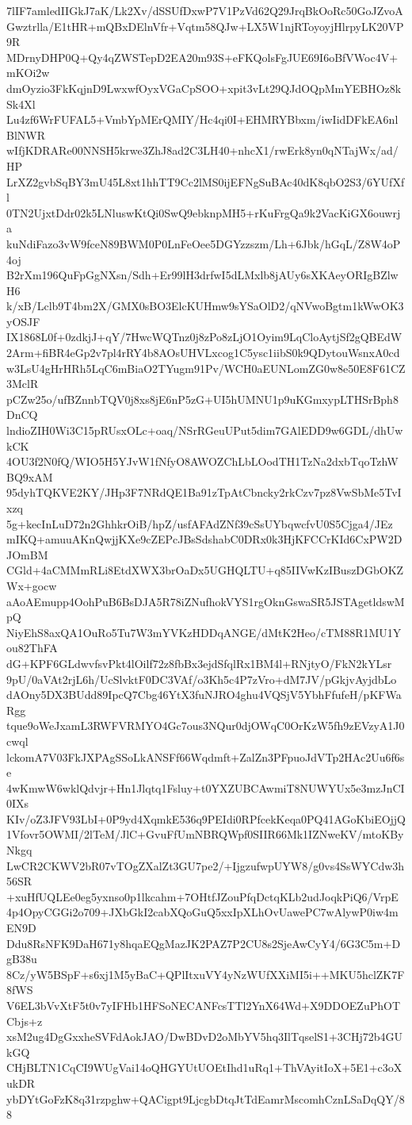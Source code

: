7lIF7amledIIGkJ7aK/Lk2Xv/dSSUfDxwP7V1PzVd62Q29JrqBkOoRc50GoJZvoA
Gwztrlla/E1tHR+mQBxDElnVfr+Vqtm58QJw+LX5W1njRToyoyjHlrpyLK20VP9R
MDrnyDHP0Q+Qy4qZWSTepD2EA20m93S+eFKQolsFgJUE69I6oBfVWoc4V+mKOi2w
dmOyzio3FkKqjnD9LwxwfOyxVGaCpSOO+xpit3vLt29QJdOQpMmYEBHOz8kSk4Xl
Lu4zf6WrFUFAL5+VmbYpMErQMIY/Hc4qi0I+EHMRYBbxm/iwIidDFkEA6nlBlNWR
wIfjKDRARe00NNSH5krwe3ZhJ8ad2C3LH40+nhcX1/rwErk8yn0qNTajWx/ad/HP
LrXZ2gvbSqBY3mU45L8xt1hhTT9Cc2lMS0ijEFNgSuBAc40dK8qbO2S3/6YUfXfl
0TN2UjxtDdr02k5LNluswKtQi0SwQ9ebknpMH5+rKuFrgQa9k2VacKiGX6ouwrja
kuNdiFazo3vW9fceN89BWM0P0LnFeOee5DGYzzszm/Lh+6Jbk/hGqL/Z8W4oP4oj
B2rXm196QuFpGgNXsn/Sdh+Er99lH3drfwI5dLMxlb8jAUy6sXKAeyORIgBZlwH6
k/xB/Lclb9T4bm2X/GMX0sBO3ElcKUHmw9sYSaOlD2/qNVwoBgtm1kWwOK3yOSJF
IX1868L0f+0zdkjJ+qY/7HwcWQTnz0j8zPo8zLjO1Oyim9LqCloAytjSf2gQBEdW
2Arm+fiBR4eGp2v7pl4rRY4b8AOsUHVLxcog1C5ysc1iibS0k9QDytouWsnxA0cd
w3LsU4gHrHRh5LqC6mBiaO2TYugm91Pv/WCH0aEUNLomZG0w8e50E8F61CZ3MclR
pCZw25o/ufBZnnbTQV0j8xs8jE6nP5zG+UI5hUMNU1p9uKGmxypLTHSrBph8DnCQ
lndioZIH0Wi3C15pRUsxOLc+oaq/NSrRGeuUPut5dim7GAlEDD9w6GDL/dhUwkCK
4OU3f2N0fQ/WIO5H5YJvW1fNfyO8AWOZChLbLOodTH1TzNa2dxbTqoTzhWBQ9xAM
95dyhTQKVE2KY/JHp3F7NRdQE1Ba91zTpAtCbncky2rkCzv7pz8VwSbMe5TvIxzq
5g+kecInLuD72n2GhhkrOiB/hpZ/usfAFAdZNf39cSsUYbqwcfvU0S5Cjga4/JEz
mIKQ+amuuAKnQwjjKXe9cZEPcJBsSdshabC0DRx0k3HjKFCCrKId6CxPW2DJOmBM
CGld+4aCMMmRLi8EtdXWX3brOaDx5UGHQLTU+q85IIVwKzIBuszDGbOKZWx+gocw
aAoAEmupp4OohPuB6BsDJA5R78iZNufhokVYS1rgOknGswaSR5JSTAgetldswMpQ
NiyEhS8axQA1OuRo5Tu7W3mYVKzHDDqANGE/dMtK2Heo/cTM88R1MU1You82ThFA
dG+KPF6GLdwvfsvPkt4lOilf72z8fbBx3ejdSfqlRx1BM4l+RNjtyO/FkN2kYLsr
9pU/0aVAt2rjL6h/UcSlvktF0DC3VAf/o3Kh5c4P7zVro+dM7JV/pGkjvAyjdbLo
dAOny5DX3BUdd89IpcQ7Cbg46YtX3fuNJRO4ghu4VQSjV5YbhFfufeH/pKFWaRgg
tque9oWeJxamL3RWFVRMYO4Gc7ous3NQur0djOWqC0OrKzW5fh9zEVzyA1J0cwql
lckomA7V03FkJXPAgSSoLkANSFf66Wqdmft+ZalZn3PFpuoJdVTp2HAc2Uu6f6se
4wKmwW6wklQdvjr+Hn1Jlqtq1Fsluy+t0YXZUBCAwmiT8NUWYUx5e3mzJnCI0IXs
KIv/oZ3JFV93LbI+0P9yd4XqmkE536q9PEIdi0RPfcekKeqa0PQ41AGoKbiEOjjQ
1Vfovr5OWMI/2lTeM/JlC+GvuFfUmNBRQWpf0SIIR66Mk1IZNweKV/mtoKByNkgq
LwCR2CKWV2bR07vTOgZXalZt3GU7pe2/+IjgzufwpUYW8/g0vs4SsWYCdw3h56SR
+xuHfUQLEe0eg5yxnso0p1lkcahm+7OHtfJZouPfqDctqKLb2udJoqkPiQ6/VrpE
4p4OpyCGGi2o709+JXbGkI2cabXQoGuQ5xxIpXLhOvUawePC7wAlywP0iw4mEN9D
Ddu8RsNFK9DaH671y8hqaEQgMazJK2PAZ7P2CU8s2SjeAwCyY4/6G3C5m+DgB38u
8Cz/yW5BSpF+s6xj1M5yBaC+QPlItxuVY4yNzWUfXXiMI5i++MKU5hclZK7F8fWS
V6EL3bVvXtF5t0v7yIFHb1HFSoNECANFcsTTl2YnX64Wd+X9DDOEZuPhOTCbjs+z
xsM2ug4DgGxxheSVFdAokJAO/DwBDvD2oMbYV5hq3IlTqselS1+3CHj72b4GUkGQ
CHjBLTN1CqCI9WUgVai14oQHGYUtUOEtIhd1uRq1+ThVAyitIoX+5E1+c3oXukDR
ybDYtGoFzK8q31rzpghw+QACigpt9LjcgbDtqJtTdEamrMscomhCznLSaDqQY/88
